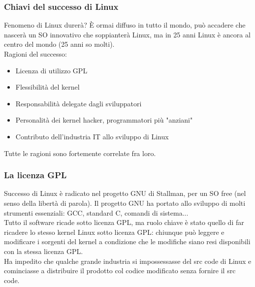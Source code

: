 \documentclass{article}
\begin{document}
\subsubsection{Chiavi del successo di Linux}
Fenomeno di Linux durerà? È ormai diffuso in tutto il mondo, può accadere che nascerà un SO innovativo che soppianterà Linux, ma in 25 anni Linux è ancora al centro del mondo (25 anni so molti).\\ Ragioni del successo:
\begin{itemize}
\item Licenza di utilizzo GPL
\item Flessibilità del kernel
\item Responsabilità delegate dagli sviluppatori
\item Personalità dei kernel hacker, programmatori più "anziani"
\item Contributo dell'industria IT allo sviluppo di Linux
\end{itemize}
Tutte le ragioni sono fortemente correlate fra loro.
\subsubsection{La licenza GPL}
Successo di Linux è radicato nel progetto GNU di Stallman, per un SO free (nel senso della libertà di parola). Il progetto GNU ha portato allo sviluppo di molti strumenti essenziali: GCC, standard C, comandi di sistema...\\ Tutto il software ricade sotto licenza GPL, ma ruolo chiave è stato quello di far ricadere lo stesso kernel Linux sotto licenza GPL: chiunque può leggere e modificare i sorgenti del kernel a condizione che le modifiche siano resi disponibili con la stessa licenza GPL.\\ Ha impedito che qualche grande industria si impossessasse del src code di Linux e cominciasse a distribuire il prodotto col codice modificato senza fornire il src code.
\end{document}
